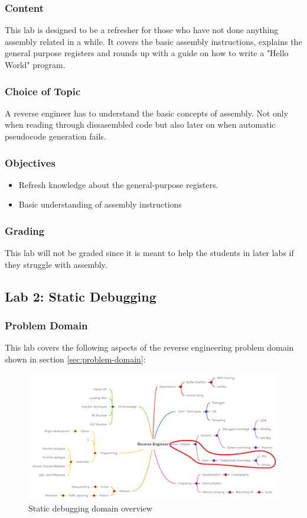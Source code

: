 \subsubsection*{Content}
This lab is designed to be a refresher for those who have not done anything assembly related in a while. It covers the basic assembly instructions, explains the general purpose registers and rounds up with a guide on how to write a "Hello World" program.  
\subsubsection*{Choice of Topic}
A reverse engineer has to understand the basic concepts of assembly. Not only when reading through dissasembled code but also later on when automatic pseudocode generation fails.
\subsubsection*{Objectives}
\begin{itemize}
    \item Refresh knowledge about the general-purpose registers.
    \item Basic understanding of assembly instructions
\end{itemize}
\subsubsection*{Grading}
This lab will not be graded since it is meant to help the students in later labs if they struggle with assembly.
\pagebreak

\subsection{Lab 2: Static Debugging}
\subsubsection*{Problem Domain}
This lab covers the following aspects of the reverse engineering problem domain shown in section \ref{sec:problem-domain}:
\vspace{-2ex}
\begin{figure}[H]
    \includegraphics[width=\textwidth]{resources/static-overview-light.png}
    \caption{Static debugging domain overview}
    \label{fig:static-overview}
\end{figure}
